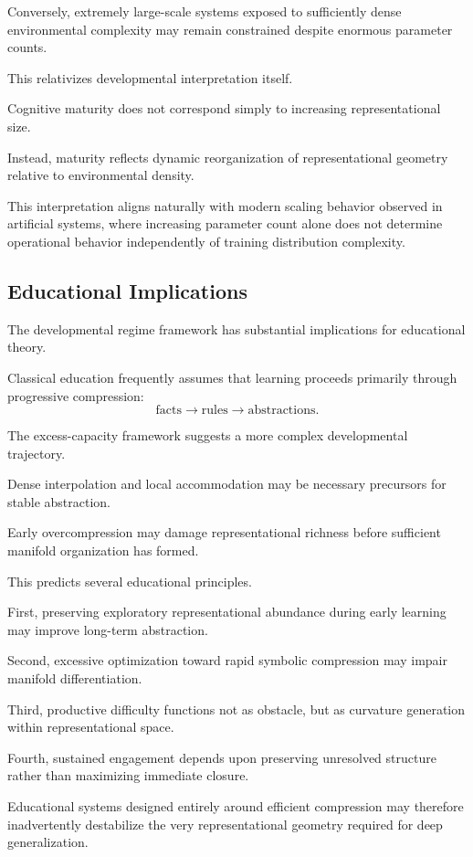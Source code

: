 \documentclass[12pt,a4paper]{article}
\begin{document}
Conversely, extremely large-scale systems exposed to sufficiently dense environmental complexity may remain constrained despite enormous parameter counts.

This relativizes developmental interpretation itself.

Cognitive maturity does not correspond simply to increasing representational size.

Instead, maturity reflects dynamic reorganization of representational geometry relative to environmental density.

This interpretation aligns naturally with modern scaling behavior observed in artificial systems, where increasing parameter count alone does not determine operational behavior independently of training distribution complexity.

\subsection{Educational Implications}

The developmental regime framework has substantial implications for educational theory.

Classical education frequently assumes that learning proceeds primarily through progressive compression:
\[
\text{facts}
\rightarrow
\text{rules}
\rightarrow
\text{abstractions}.
\]

The excess-capacity framework suggests a more complex developmental trajectory.

Dense interpolation and local accommodation may be necessary precursors for stable abstraction.

Early overcompression may damage representational richness before sufficient manifold organization has formed.

This predicts several educational principles.

First, preserving exploratory representational abundance during early learning may improve long-term abstraction.

Second, excessive optimization toward rapid symbolic compression may impair manifold differentiation.

Third, productive difficulty functions not as obstacle, but as curvature generation within representational space.

Fourth, sustained engagement depends upon preserving unresolved structure rather than maximizing immediate closure.

Educational systems designed entirely around efficient compression may therefore inadvertently destabilize the very representational geometry required for deep generalization.
\end{document}
